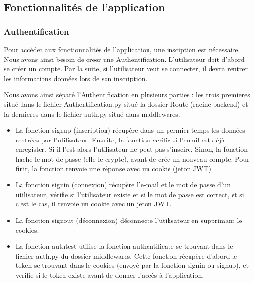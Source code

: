 \documentclass[french,a4paper]{article}
\begin{document}
\subsection{Fonctionnalités de l'application}
\subsubsection{Authentification}
Pour accèder aux fonctionnalités de l'application, une insciption est nécessaire. Nous avons ainsi besoin de creer une Authentification.
L'utilisateur doit d'abord se créer un compte. Par la suite, si l'utilisateur veut se connecter, il devra rentrer les informations données lors de 
son inscription. 

Nous avons ainsi séparé l'Authentification en plusieurs parties : les trois premieres situé dans le fichier Authentification.py situé
la dossier Route (racine backend) et la dernieres dans le fichier auth.py situé dans middlewares.
\begin{itemize}
    \item La fonction signup (inscription) récupère dans un permier temps les données rentrées par l'utilisateur. Ensuite, la fonction
verifie si l'email est déjà enregister. Si il l'est alors l'utilisateur ne peut pas s'inscire. Sinon, la fonction hache le mot de 
passe (elle le crypte), avant de crée un nouveau compte. Pour finir, la fonction renvoie une réponse avec un cookie (jeton JWT).
    \item La fonction signin (connexion) récupère l'e-mail et le mot de passe d'un utilisateur, vérifie si l'utilisateur existe et si 
le mot de passe est correct, et si c'est le cas, il renvoie un cookie avec un jeton JWT.
    \item La fonction signout (déconnexion) déconnecte l'utilisateur en supprimant le cookies.
    \item La fonction authtest utilise la fonction authentificate se trouvant dans le fichier auth.py du dossier middlewares. Cette 
fonction récupère d'abord le token se trouvant dans le cookies (envoyé par la fonction signin ou signup), et verifie si le token existe
avant de donner l'accès à l'application.
\end{itemize}
\end{document}
